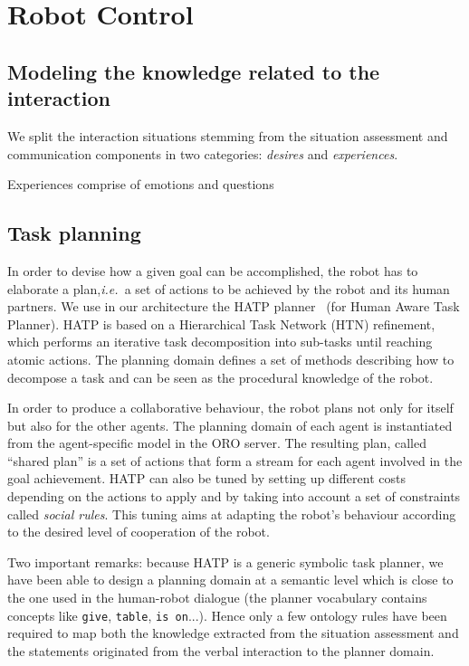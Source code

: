 \documentclass[letterpaper, 10 pt, conference]{ieeeconf}  %
\newcommand{\ie}{{\textit{i.e.\ }}}
\begin{document}
\section{Robot Control}
\label{sect|ctrl}

\subsection{Modeling the knowledge related to the interaction}

We split the interaction situations stemming from the situation assessment and
communication components in two categories: \emph{desires} and
\emph{experiences}.

Experiences comprise of emotions and questions

\subsection{Task planning}

In order to devise how a given goal can be accomplished, the robot has to
elaborate a plan,\ie a set of actions to be achieved by the robot and its human
partners.  We use in our architecture the HATP planner~\cite{Alili2009} (for
Human Aware Task Planner).  HATP is based on a Hierarchical Task Network (HTN)
refinement, which performs an iterative task decomposition into sub-tasks until
reaching atomic actions.  The planning domain defines a set of methods
describing how to decompose a task and can be seen as the procedural knowledge
of the robot.

In order to produce a collaborative behaviour, the robot plans not only for
itself but also for the other agents. The planning domain of each agent is
instantiated from the agent-specific model in the ORO server. The resulting
plan, called ``shared plan'' is a set of actions that form a stream for each
agent involved in the goal achievement. HATP can also be tuned by setting up
different costs depending on the actions to apply and by taking into account a
set of constraints called \emph{social rules}. This tuning aims at adapting the
robot's behaviour according to the desired level of cooperation of the robot.


Two important remarks: because HATP is a generic symbolic task planner, we have
been able to design a planning domain at a semantic level which is close to the
one used in the human-robot dialogue (the planner vocabulary contains concepts
like \texttt{give}, \texttt{table}, \texttt{is on}...). Hence only a few
ontology rules have been required to map both the knowledge extracted from the
situation assessment and the statements originated from the verbal interaction
to the planner domain.
\end{document}
